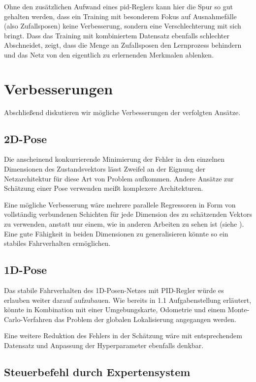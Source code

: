 Ohne den zusätzlichen Aufwand eines \acs{pid}-Reglers kann hier die Spur so gut gehalten werden, dass ein Training mit besonderem Fokus auf Ausnahmefälle (also Zufallsposen) keine Verbesserung, sondern eine Verschlechterung mit sich bringt. Dass das Training mit kombiniertem Datensatz ebenfalls schlechter Abschneidet, zeigt, dass die Menge an Zufallsposen den Lernprozess behindern und das Netz von den eigentlich zu erlernenden Merkmalen ablenken.

\newpage
\section{Verbesserungen}

Abschließend diskutieren wir mögliche Verbesserungen der verfolgten Ansätze.

\subsection{2D-Pose}

Die anscheinend konkurrierende Minimierung der Fehler in den einzelnen Dimensionen des Zustandsvektors lässt Zweifel an der Eignung der Netzarchitektur für diese Art von Problem aufkommen. Andere Ansätze zur Schätzung einer Pose verwenden meißt komplexere Architekturen.

Eine mögliche Verbesserung wäre mehrere parallele Regressoren in Form von vollständig verbundenen Schichten für jede Dimension des zu schätzenden Vektors zu verwenden, anstatt nur einem, wie in anderen Arbeiten zu sehen ist (siehe \cite{camposeestimation}). Eine gute Fähigkeit in beiden Dimensionen zu generalisieren könnte so ein stabiles Fahrverhalten ermöglichen.

\subsection{1D-Pose}

Das stabile Fahrverhalten des 1D-Posen-Netzes mit PID-Regler würde es erlauben weiter darauf aufzubauen. Wie bereits in 1.1 Aufgabenstellung erläutert, könnte in Kombination mit einer Umgebungskarte, Odometrie und einem Monte-Carlo-Verfahren das Problem der globalen Lokalisierung angegangen werden.

Eine weitere Reduktion des Fehlers in der Schätzung wäre mit entsprechendem Datensatz und Anpassung der Hyperparameter ebenfalls denkbar.

\subsection{Steuerbefehl durch Expertensystem}

